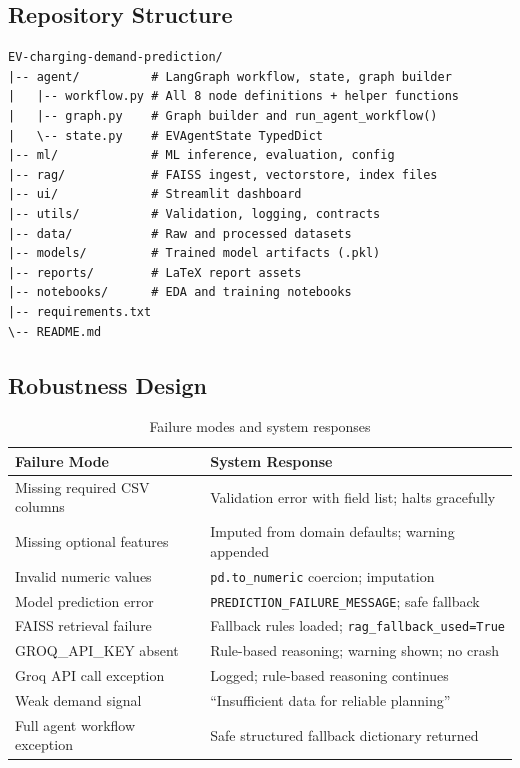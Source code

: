 \documentclass[12pt,a4paper]{article}
\begin{document}
\subsection{Repository Structure}

\begin{verbatim}
EV-charging-demand-prediction/
|-- agent/          # LangGraph workflow, state, graph builder
|   |-- workflow.py # All 8 node definitions + helper functions
|   |-- graph.py    # Graph builder and run_agent_workflow()
|   \-- state.py    # EVAgentState TypedDict
|-- ml/             # ML inference, evaluation, config
|-- rag/            # FAISS ingest, vectorstore, index files
|-- ui/             # Streamlit dashboard
|-- utils/          # Validation, logging, contracts
|-- data/           # Raw and processed datasets
|-- models/         # Trained model artifacts (.pkl)
|-- reports/        # LaTeX report assets
|-- notebooks/      # EDA and training notebooks
|-- requirements.txt
\-- README.md
\end{verbatim}

\subsection{Robustness Design}

\begin{table}[H]
\centering
\caption{Failure modes and system responses}
\begin{tabularx}{\linewidth}{lX}
  \toprule
  \textbf{Failure Mode} & \textbf{System Response} \\
  \midrule
  Missing required CSV columns  & Validation error with field list; halts gracefully \\
  Missing optional features     & Imputed from domain defaults; warning appended \\
  Invalid numeric values        & \texttt{pd.to\_numeric} coercion; imputation \\
  Model prediction error        & \texttt{PREDICTION\_FAILURE\_MESSAGE}; safe fallback \\
  FAISS retrieval failure       & Fallback rules loaded; \texttt{rag\_fallback\_used=True} \\
  GROQ\_API\_KEY absent         & Rule-based reasoning; warning shown; no crash \\
  Groq API call exception       & Logged; rule-based reasoning continues \\
  Weak demand signal            & ``Insufficient data for reliable planning'' \\
  Full agent workflow exception & Safe structured fallback dictionary returned \\
  \bottomrule
\end{tabularx}
\label{tab:robustness}
\end{table}
\end{document}
